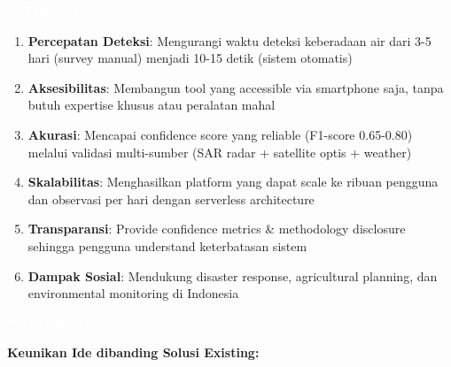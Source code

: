 \documentclass[12pt,a4paper]{article}
\newcommand{\sectionbox}[1]{%
  \colorbox{samsungblue}{%
    \parbox{\textwidth}{%
      \textcolor{white}{\large\bfseries #1}%
    }%
  }%
}
\newcommand{\subsectionbox}[1]{%
  \textbf{\large #1}\\[0.3cm]
}
\begin{document}
\vspace{1cm}

\sectionbox{6. TUJUAN}

\vspace{0.5cm}

\begin{enumerate}
  \item \textbf{Percepatan Deteksi}: Mengurangi waktu deteksi keberadaan air dari 3-5 hari (survey manual) menjadi 10-15 detik (sistem otomatis)

  \item \textbf{Aksesibilitas}: Membangun tool yang accessible via smartphone saja, tanpa butuh expertise khusus atau peralatan mahal

  \item \textbf{Akurasi}: Mencapai confidence score yang reliable (F1-score 0.65-0.80) melalui validasi multi-sumber (SAR radar + satellite optis + weather)

  \item \textbf{Skalabilitas}: Menghasilkan platform yang dapat scale ke ribuan pengguna dan observasi per hari dengan serverless architecture

  \item \textbf{Transparansi}: Provide confidence metrics \& methodology disclosure sehingga pengguna understand keterbatasan sistem

  \item \textbf{Dampak Sosial}: Mendukung disaster response, agricultural planning, dan environmental monitoring di Indonesia
\end{enumerate}

\vspace{1cm}

\sectionbox{7. INOVASI}

\vspace{0.5cm}

\subsectionbox{Keunikan Ide dibanding Solusi Existing:}
\end{document}
